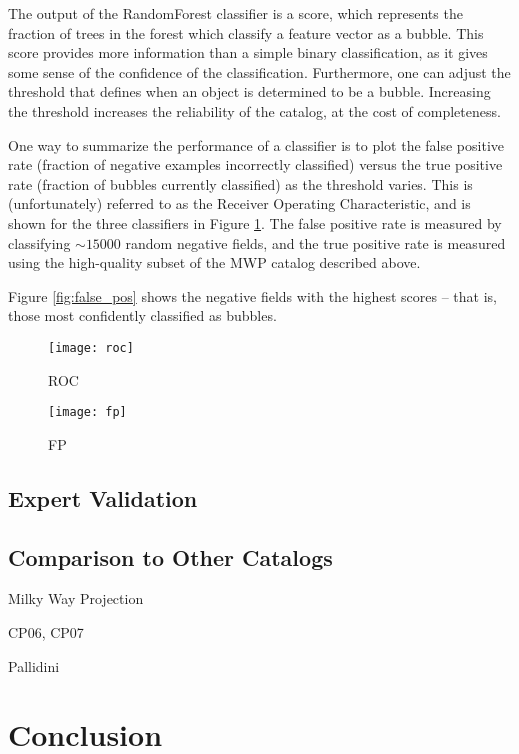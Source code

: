 \documentclass[preprint]{aastex}
\begin{document}
The output of the RandomForest classifier is a score, which represents the fraction of trees in the forest which classify a feature vector as a bubble. This score provides more information than a simple binary classification, as it gives some sense of the confidence of the classification. Furthermore, one can adjust the threshold that defines when an object is determined to be a bubble. Increasing the threshold increases the reliability of the catalog, at the cost of completeness.

One way to summarize the performance of a classifier is to plot the false positive rate (fraction of negative examples incorrectly classified) versus the true positive rate (fraction of bubbles currently classified) as the threshold varies. This is (unfortunately) referred to as the Receiver Operating Characteristic, and is shown for the three classifiers in Figure \ref{fig:roc}. The false positive rate is measured by classifying $\sim 15000$ random negative fields, and the true positive rate is measured using the high-quality subset of the MWP catalog described above.


Figure \ref{fig:false_pos} shows the negative fields with the highest scores -- that is, those most confidently classified as bubbles. 


\begin{figure}
\texttt{[image: roc]}
\caption{ROC}
\label{fig:roc}
\end{figure}


\begin{figure}
\texttt{[image: fp]}
\caption{FP}
\label{fig:fp}
\end{figure}
\subsection{Expert Validation}

\subsection{Comparison to Other Catalogs}
\label{sec:comparison}
Milky Way Projection

CP06, CP07

Pallidini



\section{Conclusion}
\label{sec:conclusion}
\end{document}
